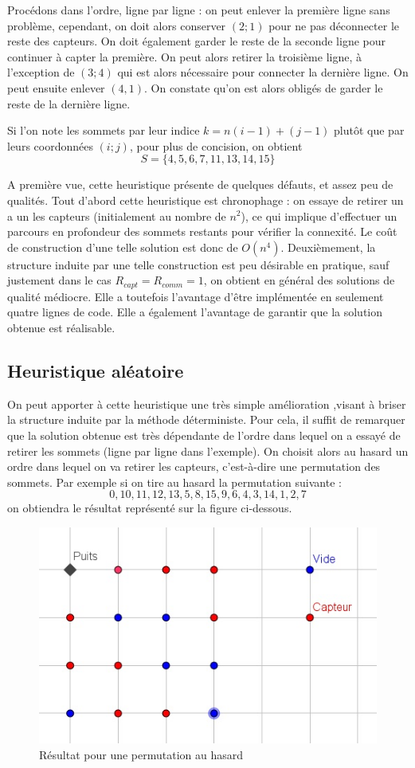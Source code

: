 \documentclass[12pt,a4paper]{article}
\begin{document}
Procédons dans l'ordre, ligne par ligne :  on peut enlever la première ligne sans problème, cependant, on doit alors conserver $(2;1)$ pour ne pas déconnecter le reste des capteurs. On doit également garder le reste de la seconde ligne pour continuer à capter la première. On peut alors retirer la troisième ligne, à l'exception de $(3;4)$ qui est alors nécessaire pour connecter la dernière ligne. On peut ensuite enlever $(4,1)$. On constate qu'on est alors obligés de garder le reste de la dernière ligne.

Si l'on note les sommets par leur indice $k=n(i-1)+(j-1)$ plutôt que par leurs coordonnées $(i;j)$, pour plus de concision, on obtient
\[S=\{4,5,6,7,11,13,14,15\}\]

A première vue, cette heuristique présente de quelques défauts, et assez peu de qualités. Tout d'abord cette heuristique est chronophage : on essaye de retirer un a un les capteurs (initialement au nombre de $n^2$), ce qui implique d'effectuer un parcours en profondeur des sommets restants pour vérifier la connexité. Le coût de construction d'une telle solution est donc de $O(n^4)$. Deuxièmement, la structure induite par une telle construction est peu désirable en pratique, sauf justement dans le cas $R_{capt}=R_{comm}=1$, on obtient en général des solutions de qualité médiocre. Elle a toutefois l'avantage d'être implémentée en seulement quatre lignes de code. Elle a également l'avantage de garantir que la solution obtenue est réalisable. 
\subsection{Heuristique aléatoire} 
On peut apporter à cette heuristique une très simple amélioration ,visant à briser la structure induite par la méthode déterministe. Pour cela, il suffit de remarquer que la solution obtenue est très dépendante de l'ordre dans lequel on a essayé de retirer les sommets (ligne par ligne dans l'exemple). On choisit alors au hasard un ordre dans lequel on va retirer les capteurs, c'est-à-dire une permutation des sommets. Par exemple si on tire au hasard la permutation suivante : \[0,10,11,12,13,5,8,15,9,6,4,3,14,1,2,7\] on obtiendra le résultat représenté sur la figure ci-dessous.
\begin{figure}[h]
\center
\includegraphics[scale=1]{Images/4_1_1_random.jpg}
\caption{Résultat pour une permutation au hasard}
\end{figure}
\end{document}

